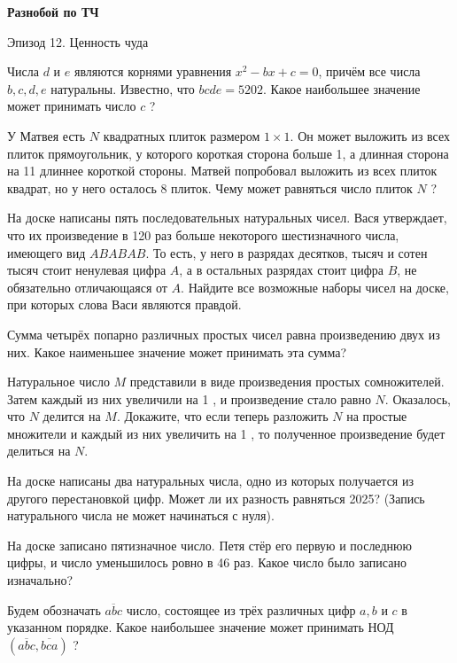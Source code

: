\centerline{\bf \Huge Разнобой по ТЧ}

\begin{flushright}
        \scriptsize{Эпизод 12. Ценность чуда}
\end{flushright}

Числа $d$ и $e$ являются корнями уравнения $x^2-b x+c=0$, причём все числа $b, c, d, e$ натуральны. Известно, что $b c d e=5202$. Какое наибольшее значение может принимать число $c$ ?

У Матвея есть $N$ квадратных плиток размером $1 \times 1$. Он может выложить из всех плиток прямоугольник, у которого короткая сторона больше 1, а длинная сторона на 11 длиннее короткой стороны. Матвей попробовал выложить из всех плиток квадрат, но у него осталось 8 плиток. Чему может равняться число плиток $N$ ?

На доске написаны пять последовательных натуральных чисел. Вася утверждает, что их произведение в 120 раз больше некоторого шестизначного числа, имеющего вид $A B A B A B$. То есть, у него в разрядах десятков, тысяч и сотен тысяч стоит ненулевая цифра $A$, а в остальных разрядах стоит цифра $B$, не обязательно отличающаяся от $A$. Найдите все возможные наборы чисел на доске, при которых слова Васи являются правдой.

Сумма четырёх попарно различных простых чисел равна произведению двух из них. Какое наименьшее значение может принимать эта сумма?

Натуральное число $M$ представили в виде произведения простых сомножителей. Затем каждый из них увеличили на 1 , и произведение стало равно $N$. Оказалось, что $N$ делится на $M$. Докажите, что если теперь разложить $N$ на простые множители и каждый из них увеличить на 1 , то полученное произведение будет делиться на $N$.


На доске написаны два натуральных числа, одно из которых получается из другого перестановкой цифр. Может ли их разность равняться 2025? (Запись натурального числа не может начинаться с нуля).

На доске записано пятизначное число. Петя стёр его первую и последнюю цифры, и число уменьшилось ровно в 46 раз. Какое число было записано изначально?

Будем обозначать $\overline{a b c}$ число, состоящее из трёх различных цифр $a, b$ и $c$ в указанном порядке. Какое наибольшее значение может принимать НОД $(\overline{a b c}, \overline{b c a})$ ?

